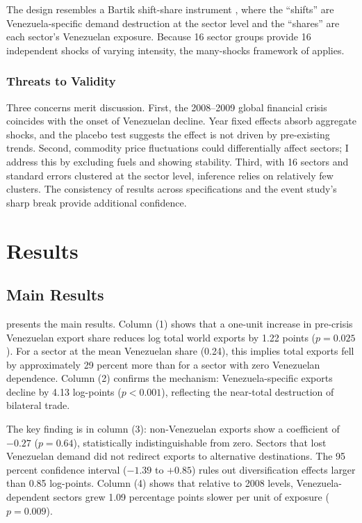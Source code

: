 \documentclass[12pt]{article}
\begin{document}
The design resembles a Bartik shift-share instrument \citep{borusyak2022quasi}, where the ``shifts'' are Venezuela-specific demand destruction at the sector level and the ``shares'' are each sector's Venezuelan exposure. Because 16 sector groups provide 16 independent shocks of varying intensity, the many-shocks framework of \citet{borusyak2022quasi} applies.

\subsubsection*{Threats to Validity} Three concerns merit discussion. First, the 2008--2009 global financial crisis coincides with the onset of Venezuelan decline. Year fixed effects absorb aggregate shocks, and the placebo test suggests the effect is not driven by pre-existing trends. Second, commodity price fluctuations could differentially affect sectors; I address this by excluding fuels and showing stability. Third, with 16 sectors and standard errors clustered at the sector level, inference relies on relatively few clusters. The consistency of results across specifications and the event study's sharp break provide additional confidence.

\section{Results}

\subsection{Main Results}



 presents the main results. Column (1) shows that a one-unit increase in pre-crisis Venezuelan export share reduces log total world exports by 1.22 points ($p = 0.025$). For a sector at the mean Venezuelan share (0.24), this implies total exports fell by approximately 29 percent more than for a sector with zero Venezuelan dependence. Column (2) confirms the mechanism: Venezuela-specific exports decline by 4.13 log-points ($p < 0.001$), reflecting the near-total destruction of bilateral trade.

The key finding is in column (3): non-Venezuelan exports show a coefficient of $-0.27$ ($p = 0.64$), statistically indistinguishable from zero. Sectors that lost Venezuelan demand did not redirect exports to alternative destinations. The 95 percent confidence interval ($-1.39$ to $+0.85$) rules out diversification effects larger than 0.85 log-points. Column (4) shows that relative to 2008 levels, Venezuela-dependent sectors grew 1.09 percentage points slower per unit of exposure ($p = 0.009$).
\end{document}
